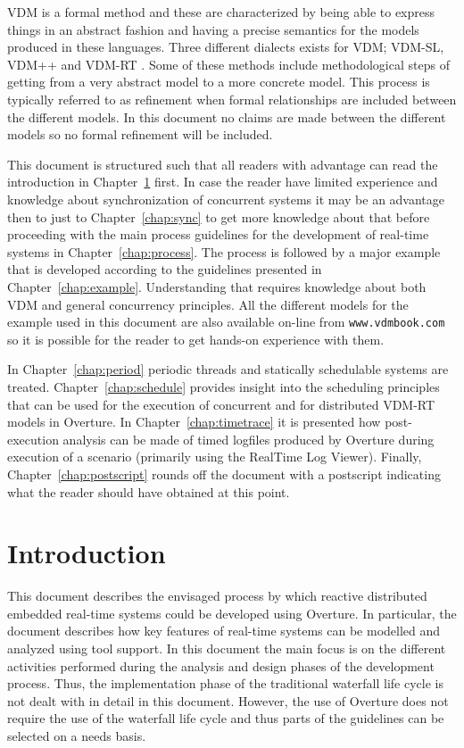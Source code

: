 \documentclass{overturerepchap}
\newcommand{\showtrace}{RealTime Log Viewer}
\newcommand{\url}[1]{\texttt{#1}}
\begin{document}
VDM \cite{Jones90a,Dawes91,Fitzgerald&98,Fitzgerald&08c} is a formal method
\cite{Craigen&93b,Hinchey&95,Woodcock&09} and these are characterized by being
able to express things in an abstract fashion and having a precise
semantics for the models produced in these languages. Three different
dialects exists for VDM;
VDM-SL, VDM++ and VDM-RT \cite{Larsen&10b}. Some of these
methods include methodological steps of getting from a very abstract
model to a more concrete model. This process is typically referred to
as refinement \cite{Jones90a,Morgan90a,Woodcock&96,Back&98} when formal
relationships are included between the different models. In this
document no claims are made between the different models so no formal
refinement will be included.

This document is structured such that all readers with advantage can
read the introduction in Chapter~\ref{chap:intro} first. In case the
reader have limited experience and knowledge about synchronization of
concurrent systems it may be an advantage then to just to
Chapter~\ref{chap:sync} to get more knowledge about that before
proceeding with the main process guidelines for the development of
real-time systems in Chapter~\ref{chap:process}. The process is followed
by a major example that is developed according to the guidelines
presented in Chapter~\ref{chap:example}. Understanding that requires
knowledge about both VDM and general concurrency principles. All the 
different models for the example used in this document are also available
on-line from \url{www.vdmbook.com} so it is possible for the reader to 
get hands-on experience with them.

In 
Chapter~\ref{chap:period} periodic threads and statically schedulable
systems are treated. Chapter~\ref{chap:schedule} provides insight 
into the scheduling principles that can be used for the execution of
concurrent and for distributed VDM-RT models in Overture. In 
Chapter~\ref{chap:timetrace} it is presented how post-execution analysis
can be made of timed logfiles produced by Overture during execution 
of a scenario (primarily using the \showtrace). 
Finally, Chapter~\ref{chap:postscript} rounds off the document with a 
postscript indicating what the reader should have obtained at this point.


\chapter{Introduction}\label{chap:intro}

This document describes the envisaged process by which reactive
distributed embedded real-time
systems could be developed using Overture. In particular, the
document describes how key features of real-time systems can be
modelled and analyzed using tool support.  In this document the main
focus is on the different activities performed during the analysis and
design phases of the development process. Thus, the implementation
phase of the traditional waterfall life cycle \cite{Royce70} is not
dealt with in detail in this document. However, the use of Overture
does not require the use of the waterfall life cycle and thus parts of
the guidelines can be selected on a needs basis.
\end{document}
